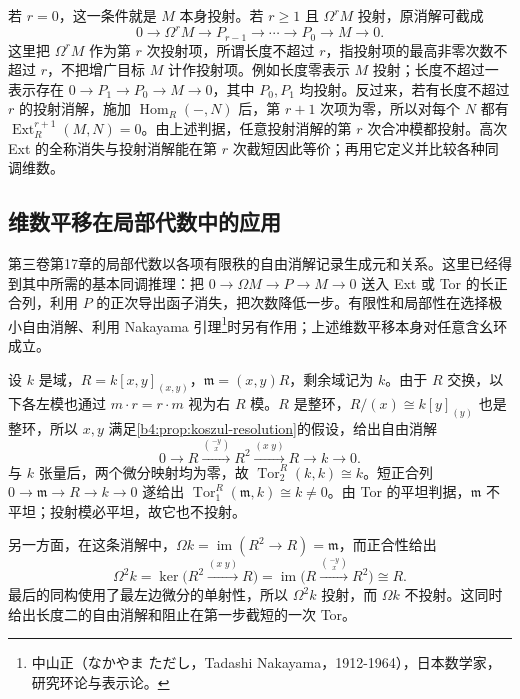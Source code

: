 若 \(r=0\)，这一条件就是 \(M\) 本身投射。若 \(r\ge1\) 且 \(\Omega^rM\) 投射，原消解可截成
\[
	0\longrightarrow\Omega^rM\longrightarrow P_{r-1}\longrightarrow\cdots \longrightarrow P_0\longrightarrow M\longrightarrow0.
\]
这里把 \(\Omega^rM\) 作为第 \(r\) 次投射项，所谓长度不超过 \(r\)，指投射项的最高非零次数不超过 \(r\)，不把增广目标 \(M\) 计作投射项。例如长度零表示 \(M\) 投射；长度不超过一表示存在 \(0\to P_1\to P_0\to M\to0\)，其中 \(P_0,P_1\) 均投射。反过来，若有长度不超过 \(r\) 的投射消解，施加 \(\operatorname{Hom}_R(-,N)\) 后，第 \(r+1\) 次项为零，所以对每个 \(N\) 都有 \(\operatorname{Ext}_R^{r+1}(M,N)=0\)。由上述判据，任意投射消解的第 \(r\) 次合冲模都投射。高次 Ext 的全称消失与投射消解能在第 \(r\) 次截短因此等价；再用它定义并比较各种同调维数。

\subsection{维数平移在局部代数中的应用}
\label{b4:subsec:0805:04}

第三卷第17章的局部代数以各项有限秩的自由消解记录生成元和关系。这里已经得到其中所需的基本同调推理：把 \(0\to\Omega M\to P\to M\to0\) 送入 Ext 或 Tor 的长正合列，利用 \(P\) 的正次导出函子消失，把次数降低一步。有限性和局部性在选择极小自由消解、利用 Nakayama 引理\footnote{中山正（なかやま ただし，Tadashi Nakayama，1912-1964），日本数学家，研究环论与表示论。}时另有作用；上述维数平移本身对任意含幺环成立。

\begin{example}\label{b4:exm:local-shift-koszul}
	设 \(k\) 是域，\(R=k[x,y]_{(x,y)}\)，\(\mathfrak m=(x,y)R\)，剩余域记为 \(k\)。由于 \(R\) 交换，以下各左模也通过 \(m\cdot r=r\cdot m\) 视为右 \(R\) 模。\(R\) 是整环，\(R/(x)\cong k[y]_{(y)}\) 也是整环，所以 \(x,y\) 满足\cref{b4:prop:koszul-resolution}的假设，给出自由消解
	\[
		0\longrightarrow R\xrightarrow{\binom{-y}{x}}R^2 \xrightarrow{(x\;y)}R\longrightarrow k\longrightarrow0.
	\]
	与 \(k\) 张量后，两个微分映射均为零，故 \(\operatorname{Tor}_2^R(k,k)\cong k\)。短正合列 \(0\to\mathfrak m\to R\to k\to0\) 遂给出 \(\operatorname{Tor}_1^R(\mathfrak m,k)\cong k\ne0\)。由 Tor 的平坦判据，\(\mathfrak m\) 不平坦；投射模必平坦，故它也不投射。

	\ProseParagraphBreak
	另一方面，在这条消解中，\(\Omega k=\operatorname{im}(R^2\to R)=\mathfrak m\)，而正合性给出
	\[
		\Omega^2k=\ker\bigl(R^2\xrightarrow{(x\;y)}R\bigr) =\operatorname{im}\bigl(R\xrightarrow{\binom{-y}{x}}R^2\bigr)\cong R.
	\]
	最后的同构使用了最左边微分的单射性，所以 \(\Omega^2k\) 投射，而 \(\Omega k\) 不投射。这同时给出长度二的自由消解和阻止在第一步截短的一次 Tor。
\end{example}
